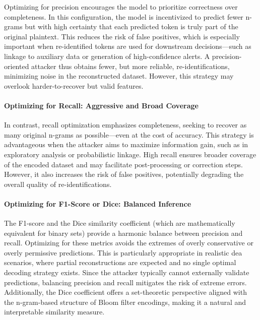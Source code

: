 Optimizing for precision encourages the model to prioritize correctness over completeness.
In this configuration, the model is incentivized to predict fewer n-grams but with high certainty that each predicted token is truly part of the original plaintext.
This reduces the risk of false positives, which is especially important when re-identified tokens are used for downstream decisions—such as linkage to auxiliary data or generation of high-confidence alerts.
A precision-oriented attacker thus obtains fewer, but more reliable, re-identifications, minimizing noise in the reconstructed dataset.
However, this strategy may overlook harder-to-recover but valid features.

\paragraph{Optimizing for Recall: Aggressive and Broad Coverage}

In contrast, recall optimization emphasizes completeness, seeking to recover as many original n-grams as possible—even at the cost of accuracy.
This strategy is advantageous when the attacker aims to maximize information gain, such as in exploratory analysis or probabilistic linkage.
High recall ensures broader coverage of the encoded dataset and may facilitate post-processing or correction steps.
However, it also increases the risk of false positives, potentially degrading the overall quality of re-identifications.

\paragraph{Optimizing for F1-Score or Dice: Balanced Inference}

The F1-score and the Dice similarity coefficient (which are mathematically equivalent for binary sets) provide a harmonic balance between precision and recall.
Optimizing for these metrics avoids the extremes of overly conservative or overly permissive predictions.
This is particularly appropriate in realistic \ac{dea} scenarios, where partial reconstructions are expected and no single optimal decoding strategy exists.
Since the attacker typically cannot externally validate predictions, balancing precision and recall mitigates the risk of extreme errors.
Additionally, the Dice coefficient offers a set-theoretic perspective aligned with the n-gram-based structure of Bloom filter encodings, making it a natural and interpretable similarity measure.


